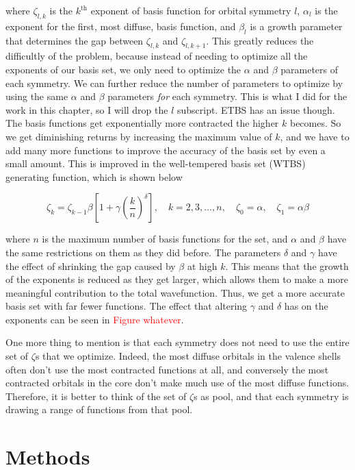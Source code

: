 \documentclass[12pt]{report}
\newcommand{\notetodylan}[1]{\textcolor{red}{#1}} %
\begin{document}
where $\zeta_{l,k}$ is the $k^{\text{th}}$ exponent of basis function for orbital symmetry $l$, $\alpha_{l}$ is the exponent for the first, most diffuse, basis function, and $\beta_{l}$ is a growth parameter that determines the gap between $\zeta_{l,k}$ and $\zeta_{l,k + 1}$. This greatly reduces the difficultly of the problem, because instead of needing to optimize all the exponents of our basis set, we only need to optimize the $\alpha$ and $\beta$ parameters of each symmetry. We can further reduce the number of parameters to optimize by using the same $\alpha$ and $\beta$ parameters \textit{for} each symmetry. This is what I did for the work in this chapter, so I will drop the $l$ subscript. ETBS has an issue though. The basis functions get exponentially more contracted the higher $k$ becomes. So we get diminishing returns by increasing the maximum value of $k$, and we have to add many more functions to improve the accuracy of the basis set by even a small amount. This is improved in the well-tempered basis set (WTBS) generating function, which is shown below

\begin{equation}
\label{eq:WTBS_gen}
\zeta_{k} = \zeta_{k-1}\beta\left[1+\gamma\left(\frac{k}{n}\right)^{\delta}\right], \quad k = 2, 3,\ldots, n, \quad \zeta_{0}=\alpha, \quad \zeta_{1} = \alpha\beta
\end{equation}

where $n$ is the maximum number of basis functions for the set, and $\alpha$ and $\beta$ have the same restrictions on them as they did before. The parameters $\delta$ and $\gamma$ have the effect of shrinking the gap caused by $\beta$ at high $k$. This means that the growth of the exponents is reduced as they get larger, which allows them to make a more meaningful contribution to the total wavefunction. Thus, we get a more accurate basis set with far fewer functions. The effect that altering $\gamma$ and $\delta$ has on the exponents can be seen in \notetodylan{Figure whatever}.

One more thing to mention is that each symmetry does not need to use the entire set of $\zeta$s that we optimize. Indeed, the most diffuse orbitals in the valence shells often don't use the most contracted functions at all, and conversely the most contracted orbitals in the core don't make much use of the most diffuse functions. Therefore, it is better to think of the set of $\zeta$s as pool, and that each symmetry is drawing a range of functions from that pool.  

\section{Methods}
\end{document}
